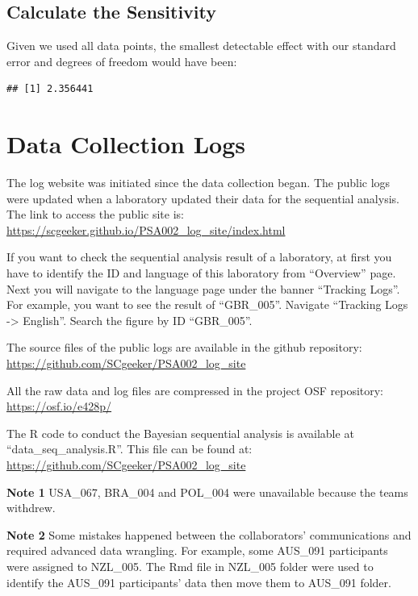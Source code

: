 \documentclass[
  man,mask,floatsintext]{apa7}
\begin{document}
\hypertarget{calculate-the-sensitivity}{%
\subsection{Calculate the Sensitivity}\label{calculate-the-sensitivity}}

Given we used all data points, the smallest detectable effect with our standard error and degrees of freedom would have been:

\begin{verbatim}
## [1] 2.356441
\end{verbatim}

\hypertarget{data-collection-logs}{%
\section{Data Collection Logs}\label{data-collection-logs}}

The log website was initiated since the data collection began. The public logs were updated when a laboratory updated their data for the sequential analysis. The link to access the public site is: \url{https://scgeeker.github.io/PSA002_log_site/index.html}

If you want to check the sequential analysis result of a laboratory, at first you have to identify the ID and language of this laboratory from ``Overview'' page. Next you will navigate to the language page under the banner ``Tracking Logs''. For example, you want to see the result of ``GBR\_005''. Navigate ``Tracking Logs -\textgreater{} English''. Search the figure by ID ``GBR\_005''.

The source files of the public logs are available in the github repository:
\url{https://github.com/SCgeeker/PSA002_log_site}

All the raw data and log files are compressed in the project OSF repository: \url{https://osf.io/e428p/}

The R code to conduct the Bayesian sequential analysis is available at ``data\_seq\_analysis.R''. This file can be found at: \url{https://github.com/SCgeeker/PSA002_log_site}

\textbf{Note 1} USA\_067, BRA\_004 and POL\_004 were unavailable because the teams withdrew.

\textbf{Note 2} Some mistakes happened between the collaborators' communications and required advanced data wrangling. For example, some AUS\_091 participants were assigned to NZL\_005. The Rmd file in NZL\_005 folder were used to identify the AUS\_091 participants' data then move them to AUS\_091 folder.
\end{document}
